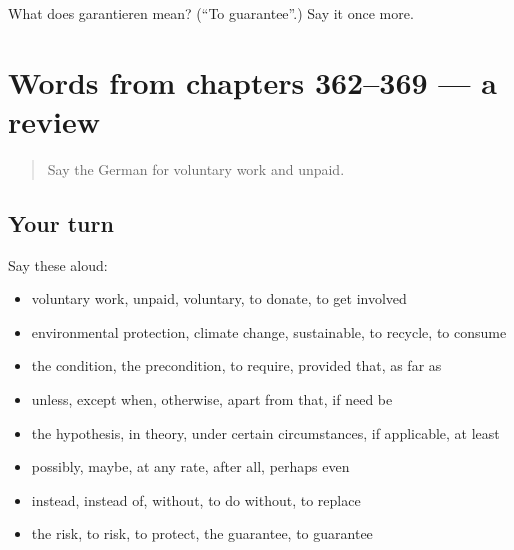 \begin{tcolorbox}[breakable,colback=teal!4,colframe=teal!35!black,title={Before you move on}]
What does garantieren mean? (\textquotedblleft{}To guarantee\textquotedblright{}.) Say it once more.
\end{tcolorbox}
\section[(dialogue)]{Words from chapters 362–369 — a review}

\label{lesson:GE-R369-review-362-369}



\begin{quote}
Say the German for voluntary work and unpaid.
\end{quote}

\subsection*{Your turn}
Say these aloud:

\begin{itemize}
\raggedright
  \item voluntary work, unpaid, voluntary, to donate, to get involved
  \item environmental protection, climate change, sustainable, to recycle, to consume
  \item the condition, the precondition, to require, provided that, as far as
  \item unless, except when, otherwise, apart from that, if need be
  \item the hypothesis, in theory, under certain circumstances, if applicable, at least
  \item possibly, maybe, at any rate, after all, perhaps even
  \item instead, instead of, without, to do without, to replace
  \item the risk, to risk, to protect, the guarantee, to guarantee
\end{itemize}

